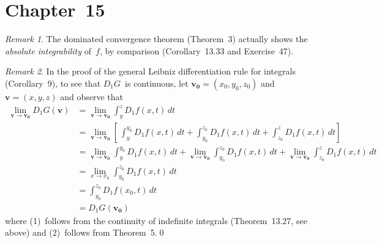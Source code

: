\documentclass[letterpaper,12pt]{article}
\renewcommand{\d}[1]{\,d\!{#1}}
\newcommand{\dt}{\d{t}}
\renewcommand{\vec}[1]{\boldsymbol{#1}}
\theoremstyle{plain}
\theoremstyle{definition}
\theoremstyle{remark}
\newtheorem*{rmk}{Remark}
\begin{document}
\section*{Chapter~15}
\begin{rmk}
The dominated convergence theorem (Theorem~3) actually shows the \emph{absolute integrability} of~\(f\), by comparison (Corollary~13.33 and Exercise~47).
\end{rmk}

\begin{rmk}
In the proof of the general Leibniz differentiation rule for integrals (Corollary~9), to see that \(D_1G\)~is continuous, let \(\vec{v_0}=(x_0,y_0,z_0)\) and \(\vec{v}=(x,y,z)\) and observe that
\begin{align*}
\lim_{\vec{v}\to\vec{v_0}}D_1G(\vec{v})&=\lim_{\vec{v}\to\vec{v_0}}\int_y^z D_1f(x,t)\dt\\
	&=\lim_{\vec{v}\to\vec{v_0}}\left[\,\int_y^{y_0}D_1f(x,t)\dt+\int_{y_0}^{z_0}D_1f(x,t)\dt+\int_{z_0}^z D_1f(x,t)\dt\right]\\
	&=\lim_{\vec{v}\to\vec{v_0}}\int_y^{y_0}\!\!\!D_1f(x,t)\dt+\lim_{\vec{v}\to\vec{v_0}}\int_{y_0}^{z_0}\!\!\!D_1f(x,t)\dt+\lim_{\vec{v}\to\vec{v_0}}\int_{z_0}^z\!D_1f(x,t)\dt\\
	&=\lim_{x\to x_0}\int_{y_0}^{z_0}D_1f(x,t)\dt\tag{1}\\
	&=\int_{y_0}^{z_0}D_1f(x_0,t)\dt\tag{2}\\
	&=D_1G(\vec{v_0})
\end{align*}
where (1)~follows from the continuity of indefinite integrals (Theorem~13.27, see above) and (2)~follows from Theorem~5.\qed
\end{rmk}
\end{document}
